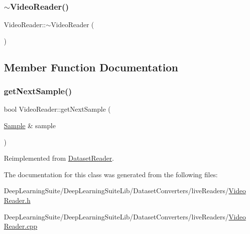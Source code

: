 \mbox{\label{class_video_reader_af865d4d939b87f3acc3d738c50ae6575}} 
\subsubsection{\texorpdfstring{$\sim$\+Video\+Reader()}{~VideoReader()}}
{\footnotesize\ttfamily Video\+Reader\+::$\sim$\+Video\+Reader (\begin{DoxyParamCaption}{ }\end{DoxyParamCaption})}



\subsection{Member Function Documentation}
\mbox{\label{class_video_reader_ae2b1921c337b9e2543616017dbd551a7}} 
\subsubsection{\texorpdfstring{get\+Next\+Sample()}{getNextSample()}}
{\footnotesize\ttfamily bool Video\+Reader\+::get\+Next\+Sample (\begin{DoxyParamCaption}\item[{\hyperlink{struct_sample}{Sample} \&}]{sample }\end{DoxyParamCaption})\hspace{0.3cm}{\ttfamily [virtual]}}



Reimplemented from \hyperlink{class_dataset_reader_af50668f52c34f4620c44e91f26dd11ce}{Dataset\+Reader}.



The documentation for this class was generated from the following files\+:\begin{DoxyCompactItemize}
\item 
Deep\+Learning\+Suite/\+Deep\+Learning\+Suite\+Lib/\+Dataset\+Converters/live\+Readers/\hyperlink{_video_reader_8h}{Video\+Reader.\+h}\item 
Deep\+Learning\+Suite/\+Deep\+Learning\+Suite\+Lib/\+Dataset\+Converters/live\+Readers/\hyperlink{_video_reader_8cpp}{Video\+Reader.\+cpp}\end{DoxyCompactItemize}
